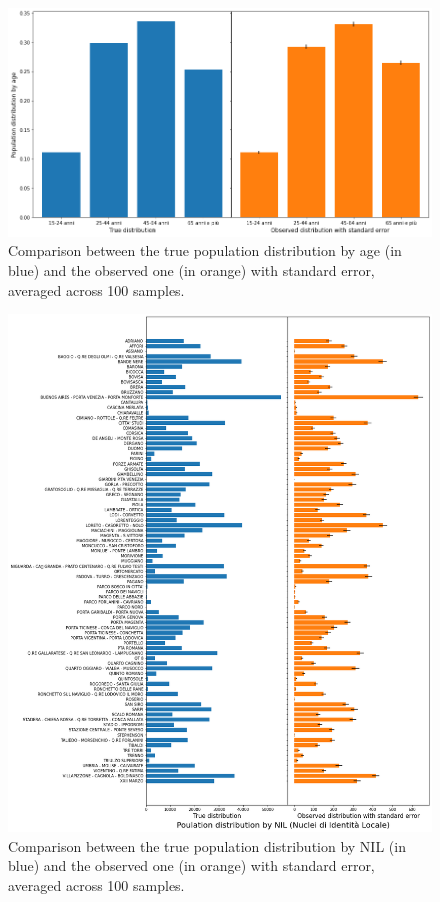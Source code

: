 \begin{figure}[H]
    \centering
    \includegraphics[scale = 0.5]{tex/pics/pop_by_age.png}
    \caption{Comparison between the true population distribution by age (in blue) and the observed one (in orange) with standard error, averaged across 100 samples.}
    \label{pop_age}
\end{figure}

\begin{figure}[H]
    \centering
    \includegraphics[scale = 0.45]{tex/pics/pop_by_nil_tot.png}
    \caption{Comparison between the true population distribution by NIL (in blue) and the observed one (in orange) with standard error, averaged across 100 samples.}
    \label{pop_nil_tot}
\end{figure}

